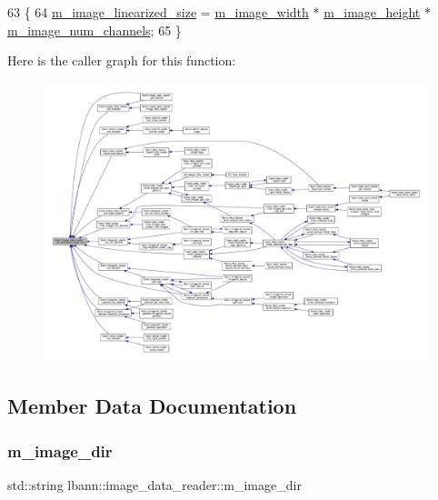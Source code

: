 \begin{DoxyCode}
63                                                   \{
64   \hyperlink{classlbann_1_1image__data__reader_af512f1f866c0f654309b7f28886dca9a}{m\_image\_linearized\_size} = \hyperlink{classlbann_1_1image__data__reader_af001f3d1c0f1c580b66988233b3a64f0}{m\_image\_width} * 
      \hyperlink{classlbann_1_1image__data__reader_a0632efa3deaa9d61e671f741909eb3fe}{m\_image\_height} * \hyperlink{classlbann_1_1image__data__reader_aab1a440f361521dc7bd583cefe1061f8}{m\_image\_num\_channels};
65 \}
\end{DoxyCode}
Here is the caller graph for this function\+:\nopagebreak
\begin{figure}[H]
\begin{center}
\leavevmode
\includegraphics[width=350pt]{classlbann_1_1image__data__reader_a0164b0e3abbe92daef73b36fb925403e_icgraph}
\end{center}
\end{figure}


\subsection{Member Data Documentation}
\mbox{\label{classlbann_1_1image__data__reader_ab1289f0207f3a9989c7b28e09a23c9a3}} 
\subsubsection{\texorpdfstring{m\+\_\+image\+\_\+dir}{m\_image\_dir}}
{\footnotesize\ttfamily std\+::string lbann\+::image\+\_\+data\+\_\+reader\+::m\+\_\+image\+\_\+dir\hspace{0.3cm}{\ttfamily [protected]}}



